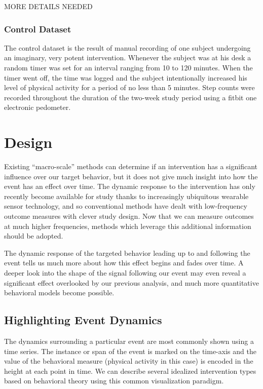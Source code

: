 \documentclass[preprint,journal]{vgtc}       %
\begin{document}
MORE DETAILS NEEDED

\subsubsection{Control Dataset}
The control dataset is the result of manual recording of one subject undergoing an imaginary, very potent intervention. 
Whenever the subject was at his desk a random timer was set for an interval ranging from 10 to 120 minutes. 
When the timer went off, the time was logged and the subject intentionally increased his level of physical activity for a period of no less than 5 minutes. 
Step counts were recorded throughout the duration of the two-week study period using a fitbit one electronic pedometer.

\section{Design}
Existing “macro-scale” methods can determine if an intervention has a significant influence over our target behavior, but it does not give much insight into how the event has an effect over time. 
The dynamic response to the intervention has only recently become available for study thanks to increasingly ubiquitous wearable sensor technology, and so conventional methods have dealt with low-frequency outcome measures with clever study design.
Now that we can measure outcomes at much higher frequencies, methods which leverage this additional information should be adopted.

The dynamic response of the targeted behavior leading up to and following the event tells us much  more about how this effect begins and fades over time. 
A deeper look into the shape of the signal following our event may even reveal a significant effect overlooked by our previous analysis, and much more quantitative behavioral models become possible. 

\subsection{Highlighting Event Dynamics}
The dynamics surrounding a particular event are most commonly shown using a time series. 
The instance or span of the event is marked on the time-axis and the value of the behavioral measure (physical activity in this case) is encoded in the height at each point in time. 
We can describe several idealized intervention types based on behavioral theory using this common visualization paradigm.
\end{document}
